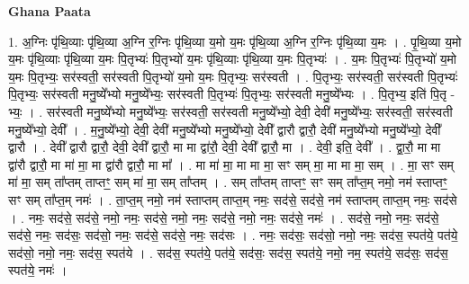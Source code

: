 \documentclass[17pt]{extarticle}
\begin{document}
\textbf{Ghana Paata } \newline

1. अ॒ग्निः पृ॑थि॒व्याः पृ॑थि॒व्या अ॒ग्नि र॒ग्निः पृ॑थि॒व्या य॒मो य॒मः पृ॑थि॒व्या अ॒ग्नि र॒ग्निः पृ॑थि॒व्या य॒मः । . पृ॒थि॒व्या य॒मो य॒मः पृ॑थि॒व्याः पृ॑थि॒व्या य॒मः पि॒तृभ्यः॑ पि॒तृभ्यो॑ य॒मः पृ॑थि॒व्याः पृ॑थि॒व्या य॒मः पि॒तृभ्यः॑ । . य॒मः पि॒तृभ्यः॑ पि॒तृभ्यो॑ य॒मो य॒मः पि॒तृभ्यः॒ सर॑स्वती॒ सर॑स्वती पि॒तृभ्यो॑ य॒मो य॒मः पि॒तृभ्यः॒ सर॑स्वती । . पि॒तृभ्यः॒ सर॑स्वती॒ सर॑स्वती पि॒तृभ्यः॑ पि॒तृभ्यः॒ सर॑स्वती मनु॒ष्ये᳚भ्यो मनु॒ष्ये᳚भ्यः॒ सर॑स्वती पि॒तृभ्यः॑ पि॒तृभ्यः॒ सर॑स्वती मनु॒ष्ये᳚भ्यः । . पि॒तृभ्य॒ इति॑ पि॒तृ - भ्यः॒ । . सर॑स्वती मनु॒ष्ये᳚भ्यो मनु॒ष्ये᳚भ्यः॒ सर॑स्वती॒ सर॑स्वती मनु॒ष्ये᳚भ्यो॒ देवी॒ देवी॑ मनु॒ष्ये᳚भ्यः॒ सर॑स्वती॒ सर॑स्वती मनु॒ष्ये᳚भ्यो॒ देवी᳚ । . म॒नु॒ष्ये᳚भ्यो॒ देवी॒ देवी॑ मनु॒ष्ये᳚भ्यो मनु॒ष्ये᳚भ्यो॒ देवी᳚ द्वारौ द्वारौ॒ देवी॑ मनु॒ष्ये᳚भ्यो मनु॒ष्ये᳚भ्यो॒ देवी᳚ द्वारौ । . देवी᳚ द्वारौ द्वारौ॒ देवी॒ देवी᳚ द्वारौ॒ मा मा द्वा॑रौ॒ देवी॒ देवी᳚ द्वारौ॒ मा । . देवी॒ इति॒ देवी᳚ । . द्वा॒रौ॒ मा मा द्वा॑रौ द्वारौ॒ मा मा॑ मा॒ मा द्वा॑रौ द्वारौ॒ मा मा᳚ । . मा मा॑ मा॒ मा मा मा॒ सꣳ सम् मा॒ मा मा मा॒ सम् । . मा॒ सꣳ सम् मा॑ मा॒ सम् ता᳚प्तम् ताप्तꣳ॒॒ सम् मा॑ मा॒ सम् ता᳚प्तम् । . सम् ता᳚प्तम् ताप्तꣳ॒॒ सꣳ सम् ता᳚प्त॒म् नमो॒ नम॑ स्ताप्तꣳ॒॒ सꣳ सम् ता᳚प्त॒म् नमः॑ । . ता॒प्त॒म् नमो॒ नम॑ स्ताप्तम् ताप्त॒म् नमः॒ सद॑से॒ सद॑से॒ नम॑ स्ताप्तम् ताप्त॒म् नमः॒ सद॑से । . नमः॒ सद॑से॒ सद॑से॒ नमो॒ नमः॒ सद॑से॒ नमो॒ नमः॒ सद॑से॒ नमो॒ नमः॒ सद॑से॒ नमः॑ । . सद॑से॒ नमो॒ नमः॒ सद॑से॒ सद॑से॒ नमः॒ सद॑सः॒ सद॑सो॒ नमः॒ सद॑से॒ सद॑से॒ नमः॒ सद॑सः । . नमः॒ सद॑सः॒ सद॑सो॒ नमो॒ नमः॒ सद॑स॒ स्पत॑ये॒ पत॑ये॒ सद॑सो॒ नमो॒ नमः॒ सद॑स॒ स्पत॑ये । . सद॑स॒ स्पत॑ये॒ पत॑ये॒ सद॑सः॒ सद॑स॒ स्पत॑ये॒ नमो॒ नम॒ स्पत॑ये॒ सद॑सः॒ सद॑स॒ स्पत॑ये॒ नमः॑ । \newline
\end{document}
